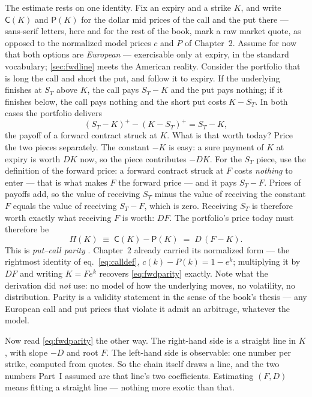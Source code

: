 The estimate rests on one identity.  Fix an expiry and a strike $K$,
and write $\mathsf{C}(K)$ and $\mathsf{P}(K)$ for the dollar mid
prices of the call and the put there --- sans-serif letters, here and
for the rest of the book, mark a raw market quote, as opposed to the
normalized model prices $c$ and $P$ of Chapter~2.  Assume for now that both options are \emph{European} --- exercisable
only at expiry, in the standard vocabulary; \cref{sec:fwdline} meets
the American reality.  Consider the portfolio that is long the call
and short the put, and follow it to expiry.  If the underlying finishes at $S_T$ above $K$, the call pays
$S_T-K$ and the put pays nothing; if it finishes below, the call pays
nothing and the short put costs $K-S_T$.  In both cases the portfolio
delivers
\[
(S_T-K)^+-(K-S_T)^+=S_T-K ,
\]
the payoff of a forward contract struck at $K$.  What is that worth
today?  Price the two pieces separately.  The constant $-K$ is easy: a
sure payment of $K$ at expiry is worth $DK$ now, so the piece
contributes $-DK$.  For the $S_T$ piece, use the definition of the
forward price: a forward contract struck at $F$ costs \emph{nothing}
to enter --- that is what makes $F$ the forward price --- and it pays
$S_T-F$.  Prices of payoffs add, so the value of receiving $S_T$
minus the value of receiving the constant $F$ equals the value of
receiving $S_T-F$, which is zero.  Receiving $S_T$ is therefore worth
exactly what receiving $F$ is worth: $DF$.  The portfolio's price today must therefore be
\begin{equation}
\Pi(K)\;\equiv\;\mathsf{C}(K)-\mathsf{P}(K)\;=\;D\,(F-K).
\label{eq:fwdparity}
\end{equation}
This is \emph{put--call parity} \citep{Stoll1969,Hull2018}.  Chapter~2
already carried its normalized form --- the rightmost identity of
eq.~\ref{eq:calldef}, $c(k)-P(k)=1-e^k$; multiplying it by $DF$ and
writing $K=Fe^k$ recovers \eqref{eq:fwdparity} exactly.  Note what the
derivation did \emph{not} use: no model of how the underlying moves,
no volatility, no distribution.  Parity is a validity statement in the
sense of the book's thesis --- any European call and put prices that
violate it admit an arbitrage, whatever the model.

Now read \eqref{eq:fwdparity} the other way.  The right-hand side is a
straight line in $K$, with slope $-D$ and root $F$.  The left-hand
side is observable: one number per strike, computed from quotes.  So
the chain itself draws a line, and the two numbers Part~I assumed are
that line's two coefficients.  Estimating $(F,D)$ means fitting a
straight line --- nothing more exotic than that.

